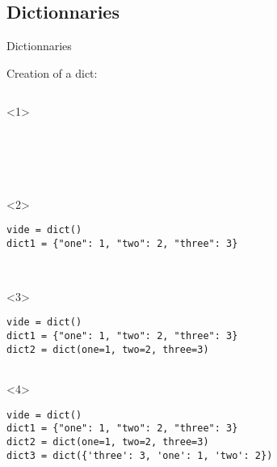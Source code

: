\subsection{Dictionnaries}

\begin{frame}[fragile]{Dictionnaries}

  \begin{center}

  Creation of a dict:

  \medskip

  \begin{columns}[onlytextwidth]
    \begin{column}{\textwidth}

      \begin{onlyenv}<1>
        \begin{lstlisting}[style=python,morekeywords={for, in, range, list}]





 \end{lstlisting}
      \end{onlyenv}

      \begin{onlyenv}<2>
        \begin{lstlisting}[style=python,morekeywords={for, in, range, list}]
vide = dict()
dict1 = {"one": 1, "two": 2, "three": 3}



 \end{lstlisting}
      \end{onlyenv}

      \begin{onlyenv}<3>
        \begin{lstlisting}[style=python,morekeywords={for, in, range, list}]
vide = dict()
dict1 = {"one": 1, "two": 2, "three": 3}
dict2 = dict(one=1, two=2, three=3)


 \end{lstlisting}
      \end{onlyenv}

      \begin{onlyenv}<4>
        \begin{lstlisting}[style=python,morekeywords={for, in, range, list}]
vide = dict()
dict1 = {"one": 1, "two": 2, "three": 3}
dict2 = dict(one=1, two=2, three=3)
dict3 = dict({'three': 3, 'one': 1, 'two': 2})


\end{lstlisting}
\end{onlyenv}
\end{column}
\end{columns}
\end{center}
\end{frame}
